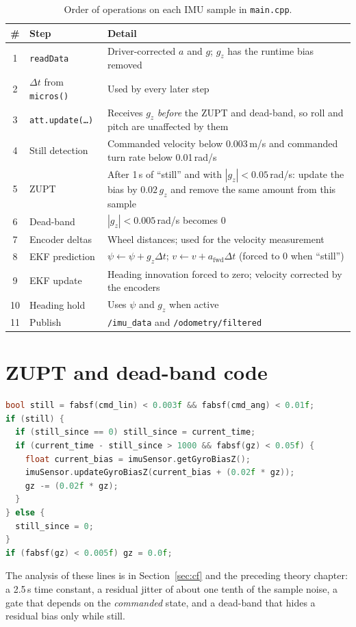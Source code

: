 \documentclass[11pt,a4paper]{report}
\newcommand{\code}[1]{\texttt{#1}}
\begin{document}
\begin{table}[H]
\centering
\caption{Order of operations on each IMU sample in \code{main.cpp}.}\label{tab:order}
\small
\begin{tabular}{@{}cp{5.2cm}p{7.2cm}@{}}
\toprule
\# & Step & Detail\\
\midrule
1 & \code{readData} & Driver-corrected $a$ and $g$; $g_z$ has the runtime bias removed\\
2 & $\Delta t$ from \code{micros()} & Used by every later step\\
3 & \code{att.update(\dots)} & Receives $g_z$ \emph{before} the ZUPT and dead-band, so roll and pitch are unaffected by them\\
4 & Still detection & Commanded velocity below 0.003\,m/s and commanded turn rate below 0.01\,rad/s\\
5 & ZUPT & After 1\,s of ``still'' and with $|g_z|<0.05$\,rad/s: update the bias by $0.02\,g_z$ and remove the same amount from this sample\\
6 & Dead-band & $|g_z|<0.005$\,rad/s becomes 0\\
7 & Encoder deltas & Wheel distances; used for the velocity measurement\\
8 & EKF prediction & $\psi\leftarrow\psi+g_z\Delta t$; $v\leftarrow v+a_{\mathrm{fwd}}\Delta t$ (forced to 0 when ``still'')\\
9 & EKF update & Heading innovation forced to zero; velocity corrected by the encoders\\
10 & Heading hold & Uses $\psi$ and $g_z$ when active\\
11 & Publish & \code{/imu\_data} and \code{/odometry/filtered}\\
\bottomrule
\end{tabular}
\end{table}

\section{ZUPT and dead-band code}
\begin{lstlisting}[language=C++,caption={ZUPT and dead-band in the IMU block.},label={lst:zupt}]
bool still = fabsf(cmd_lin) < 0.003f && fabsf(cmd_ang) < 0.01f;
if (still) {
  if (still_since == 0) still_since = current_time;
  if (current_time - still_since > 1000 && fabsf(gz) < 0.05f) {
    float current_bias = imuSensor.getGyroBiasZ();
    imuSensor.updateGyroBiasZ(current_bias + (0.02f * gz));
    gz -= (0.02f * gz);
  }
} else {
  still_since = 0;
}
if (fabsf(gz) < 0.005f) gz = 0.0f;
\end{lstlisting}
The analysis of these lines is in Section~\ref{sec:cf} and the preceding theory chapter: a 2.5\,s time constant, a residual jitter of about one tenth of the sample noise, a gate that depends on the \emph{commanded} state, and a dead-band that hides a residual bias only while still.
\end{document}
